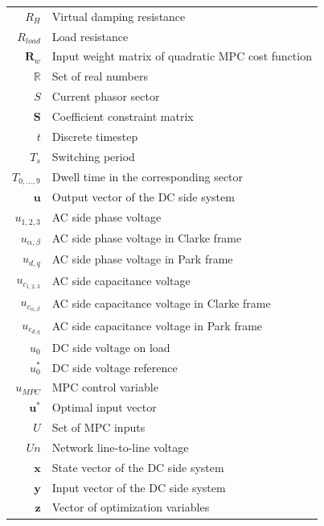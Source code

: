 \begin{scriptsize}
\begin{tabularx}{\textwidth}{r|X}
  $R_H$                             & Virtual damping resistance\\
  $R_{load}$                        & Load resistance\\
  $\textbf{R}_w$                & Input weight matrix of quadratic MPC cost function\\
  $\mathbb{R}$                      & Set of real numbers\\
  $S$                               & Current phasor sector\\
  $\textbf{S}$                  & Coefficient constraint matrix\\
  $t$                               & Discrete timestep\\
  $T_s$                             & Switching period\\
  $T_{0,\dots,9}$                   & Dwell time in the corresponding sector\\
  $\textbf{u}$                  & Output vector of the DC side system\\
  $u_{1,2,3}$                       & AC side phase voltage\\
  $u_{\alpha,\beta}$                & AC side phase voltage in Clarke frame\\
  $u_{d,q}$                         & AC side phase voltage in Park frame\\
  $u_{c_{1,2,3}}$                   & AC side capacitance voltage\\
  $u_{c_{\alpha,\beta}}$            & AC side capacitance voltage in Clarke frame\\
  $u_{c_{d,q}}$                     & AC side capacitance voltage in Park frame\\
  $u_0$                             & DC side voltage on load\\
  $u^*_0$                           & DC side voltage reference\\
  $u_{MPC}$                         & MPC control variable\\
  $\textbf{u}^*$                & Optimal input vector\\
  $U$                               & Set of MPC inputs\\
  $Un$                              & Network line-to-line voltage\\
  $\textbf{x}$                  & State vector of the DC side system\\
  $\textbf{y}$                  & Input vector of the DC side system\\
  $\textbf{z}$                  & Vector of optimization variables\\

\end{tabularx}
\end{scriptsize}
